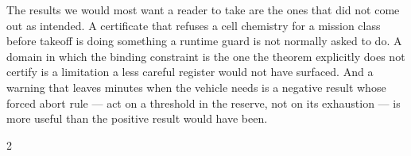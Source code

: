 \documentclass[11pt,letterpaper]{article}
\theoremstyle{definition}
\theoremstyle{remark}
\begin{document}
The results we would most want a reader to take are the ones that did not come out as intended.
A certificate that refuses a cell chemistry for a mission class before takeoff is doing
something a runtime guard is not normally asked to do. A domain in which the binding constraint
is the one the theorem explicitly does not certify is a limitation a less careful register would
not have surfaced. And a warning that leaves \uIceClosureMed{} minutes when the vehicle
needs \uIceTransit{} is a negative result whose forced abort rule --- act on a threshold in the
reserve, not on its exhaustion --- is more useful than the positive result would have been.

{\scriptsize
\setlength{\bibsep}{0pt plus 0.2ex}
\begin{multicols}{2}


\end{multicols}}


\appendix
\end{document}
